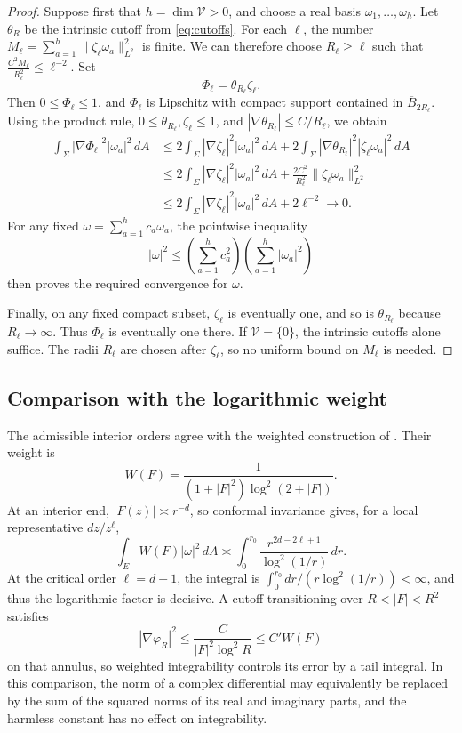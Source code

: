 \documentclass[11pt]{amsart}
\numberwithin{equation}{section}
\theoremstyle{definition}
\theoremstyle{remark}
\begin{document}
\begin{proof}
Suppose first that $h=\dim\mathcal V>0$, and choose a real basis
$\omega_1,\ldots,\omega_h$. Let $\theta_R$ be the intrinsic cutoff
from \eqref{eq:cutoffs}. For each $\ell$, the number
\(
M_\ell=\sum_{a=1}^h
\|\zeta_\ell\omega_a\|_{L^2}^2
\)
is finite. We can therefore choose $R_\ell\ge\ell$ such that
\(
\frac{C^2M_\ell}{R_\ell^2}\le\ell^{-2}.
\)
Set
\[
\Phi_\ell=\theta_{R_\ell}\zeta_\ell.
\]
Then $0\le\Phi_\ell\le1$, and $\Phi_\ell$ is Lipschitz with compact
support contained in $\overline B_{2R_\ell}$.
Using the product rule, $0\le\theta_{R_\ell},\zeta_\ell\le1$,
and $|\nabla\theta_{R_\ell}|\le C/R_\ell$, we obtain
\begin{align*}
\int_\Sigma|\nabla\Phi_\ell|^2|\omega_a|^2\,dA
&\le
2\int_\Sigma|\nabla\zeta_\ell|^2|\omega_a|^2\,dA
+2\int_\Sigma
|\nabla\theta_{R_\ell}|^2|\zeta_\ell\omega_a|^2\,dA\\
&\le
2\int_\Sigma|\nabla\zeta_\ell|^2|\omega_a|^2\,dA
+\frac{2C^2}{R_\ell^2}
\|\zeta_\ell\omega_a\|_{L^2}^2\\
&\le
2\int_\Sigma|\nabla\zeta_\ell|^2|\omega_a|^2\,dA
+2\ell^{-2}
\longrightarrow0.
\end{align*}
For any fixed $\omega=\sum_{a=1}^h c_a\omega_a$,
the pointwise inequality
\[
|\omega|^2
\le
\left(\sum_{a=1}^h c_a^2\right)
\left(\sum_{a=1}^h|\omega_a|^2\right)
\]
then proves the required convergence for $\omega$.

Finally, on any fixed compact subset, $\zeta_\ell$ is eventually
one, and so is $\theta_{R_\ell}$ because $R_\ell\to\infty$.
Thus $\Phi_\ell$ is eventually one there.
If $\mathcal V=\{0\}$, the intrinsic cutoffs alone suffice.
The radii $R_\ell$ are chosen after $\zeta_\ell$, so no uniform
bound on $M_\ell$ is needed.
\end{proof}

\subsection{Comparison with the logarithmic weight}
The admissible interior orders agree with the weighted construction of \cite[Section~3]{CM23}. Their weight is
\[
W(F)=\frac{1}{(1+|F|^2)\log^2(2+|F|)}.
\]
At an interior end, $|F(z)|\asymp r^{-d}$, so conformal invariance gives, for a local representative $dz/z^\ell$,
\[
\int_E W(F)|\omega|^2\,dA
\asymp\int_0^{r_0}
\frac{r^{2d-2\ell+1}}{\log^2(1/r)}\,dr.
\]
At the critical order $\ell=d+1$, the integral is
$\int_0^{r_0}dr/(r\log^2(1/r))<\infty$, and thus the logarithmic factor is decisive. A cutoff transitioning over $R<|F|<R^2$ satisfies
\[
|\nabla\varphi_R|^2\le\frac{C}{|F|^2\log^2R}\le C'W(F)
\]
on that annulus, so weighted integrability controls its error by a tail integral. In this comparison, the norm of a complex differential may equivalently be replaced by the sum of the squared norms of its real and imaginary parts, and the harmless constant has no effect on integrability.
\end{document}
